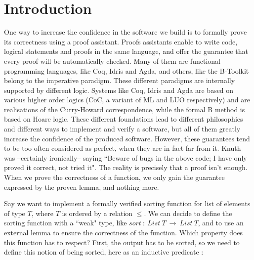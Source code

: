 \section{Introduction}


One way to increase the confidence in the software we build is to formally prove its correctness using a proof assistant. Proofs assistants enable to write code, logical statements and proofs in the same language, and offer the guarantee that every proof will be automatically checked. Many of them are functional programming languages, like Coq, Idris and Agda, and others, like the B-Toolkit belong to the imperative paradigm. These different paradigms are internally supported by different logic. Systems like Coq, Idris and Agda are based on various higher order logics (CoC, a variant of ML and LUO respectively) and are realisations of the Curry-Howard correspondence, while the formal B method is based on Hoare logic. These different foundations lead to different philosophies and different ways to implement and verify a software, but all of them greatly increase the confidence of the produced software. However, these guarantees tend to be too often considered as perfect, when they are in fact far from it. Knuth was --certainly ironically-- saying ``Beware of bugs in the above code; I have only proved it correct, not tried it". The reality is precisely that a proof isn't enough. When we prove the correctness of a function, we only gain the guarantee expressed by the proven lemma, and nothing more. 

Say we want to implement a formally verified sorting function for list of elements of type $T$, where $T$ is ordered by a relation $\leq$.
We can decide to define the sorting function with a ``weak" type, like $sort\ :\ List\ T\ \rightarrow\ List\ T$, and to use an external lemma to ensure the correctness of the function. Which property does this function has to respect? First, the output has to be sorted, so we need to define this notion of being sorted, here as an inductive predicate :

